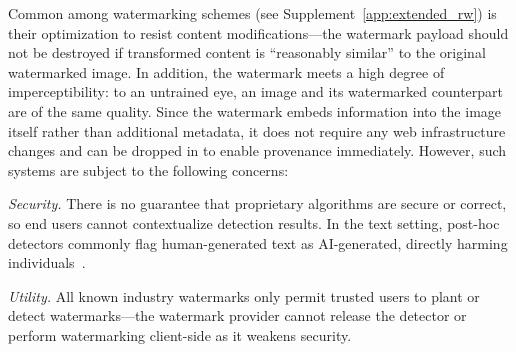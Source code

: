 \documentclass[12pt]{article}
\begin{document}
Common among watermarking schemes (see Supplement~\ref{app:extended_rw}) is their optimization to resist content modifications---the watermark payload should not be destroyed if transformed content is ``reasonably similar'' to the original watermarked image.
In addition, the watermark meets a high degree of imperceptibility: to an untrained eye, an image and its watermarked counterpart are of the same quality.
Since the watermark embeds information into the image itself rather than additional metadata, it does not require any web infrastructure changes and can be dropped in to enable provenance immediately.
However, such systems are subject to the following concerns:

 
\textit{Security.} 
There is no guarantee that proprietary algorithms are secure or correct, so end users cannot contextualize detection results.
In the text setting, post-hoc detectors commonly flag human-generated text as AI-generated, directly harming individuals~\citep{gegg2024ai}.

\textit{Utility.} All known industry watermarks only permit trusted users to plant or detect watermarks---the watermark provider cannot release the detector or perform watermarking client-side as it weakens security.
\end{document}
